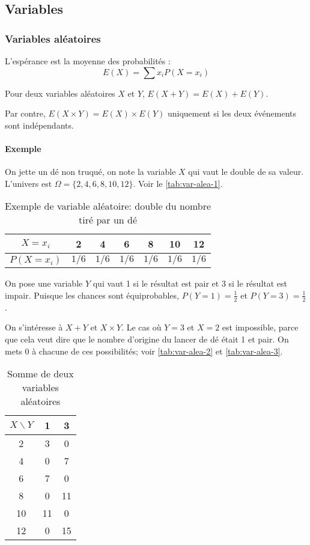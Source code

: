 \documentclass[10pt,a4paper,french]{article}
\begin{document}
\subsection{Variables}

\subsubsection{Variables aléatoires}

L'espérance est la moyenne des probabilités : \[ E(X) = \sum x_i P(X=x_i) \]

Pour deux variables aléatoires $X$ et $Y$, $E(X+Y) = E(X) + E(Y)$.

Par contre, $E(X \times Y) = E(X) \times E(Y)$ uniquement si les deux événements sont indépendants.

\paragraph{Exemple}

On jette un dé non truqué, on note la variable $X$ qui vaut le double de sa valeur. L'univers est $\Omega=\lbrace 2, 4, 6, 8, 10, 12 \rbrace$. Voir le \autoref{tab:var-alea-1}.

\begin{table}[h]
\caption{\label{tab:var-alea-1} Exemple de variable aléatoire: double du nombre tiré par un dé}
\centering
\begin{tabular}{c|cccccc}
$X=x_i$ & 2 & 4 & 6 & 8 & 10 & 12\\
\hline
$P(X=x_i)$ & $1/6$ & $1/6$ & $1/6$ & $1/6$ & $1/6$ & $1/6$\\
\end{tabular}
\end{table}

On pose une variable $Y$ qui vaut 1 si le résultat est pair et 3 si le résultat est impair. Puisque les chances sont équiprobables, $P(Y=1) = \frac{1}{2}$ et $P(Y=3) = \frac{1}{2}$.

On s'intéresse à $X+Y$ et $X \times Y$. Le cas où $Y=3$ et $X=2$ est impossible, parce que cela veut dire que le nombre d'origine du lancer de dé était 1 et pair. On mets 0 à chacune de ces possibilités; voir \autoref{tab:var-alea-2} et \autoref{tab:var-alea-3}.

\begin{table}[h]
\caption{\label{tab:var-alea-2} Somme de deux variables aléatoires}
\centering
\begin{tabular}{c|cc}
$X \backslash Y$ & 1 & 3\\
\hline
2 & 3 & 0\\
4 & 0 & 7\\
6 & 7 & 0\\
8 & 0 & 11\\
10 & 11 & 0\\
12 & 0 & 15\\
\end{tabular}
\end{table}
\end{document}
